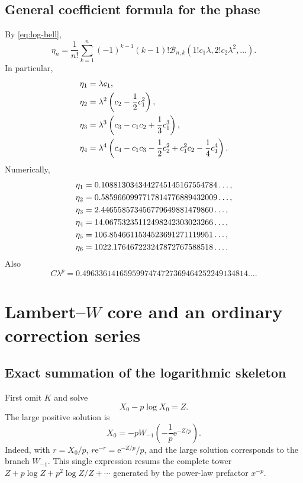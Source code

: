 \documentclass[11pt,a4paper,oneside,openany]{book}
\theoremstyle{definition}
\theoremstyle{remark}
\newcommand{\e}{\mathrm e}
\newcommand{\pBell}[2]{\mathcal B_{#1,#2}}
\begin{document}
\section{General coefficient formula for the phase}
By \cref{eq:log-bell},
\begin{equation}
 \boxed{
 \eta_n=\frac1{n!}\sum_{k=1}^n(-1)^{k-1}(k-1)!
 \pBell nk(1!c_1\lambda,2!c_2\lambda^2,\ldots).}
 \label{eq:eta-master}
\end{equation}
In particular,
\begin{align}
 \eta_1&=\lambda c_1,\notag\\
 \eta_2&=\lambda^2\left(c_2-\frac12c_1^2\right),\notag\\
 \eta_3&=\lambda^3\left(c_3-c_1c_2+\frac13c_1^3\right),\notag\\
 \eta_4&=\lambda^4\left(c_4-c_1c_3-\frac12c_2^2+c_1^2c_2-\frac14c_1^4\right).
 \label{eq:eta-first-symbolic}
\end{align}
Numerically,
\begin{align}
 \eta_1={}&0.1088130343442745145167554784\ldots,\notag\\
 \eta_2={}&0.5859660997717814776889432009\ldots,\notag\\
 \eta_3={}&2.446558573456779649881479860\ldots,\notag\\
 \eta_4={}&14.06753235112498242303023266\ldots,\notag\\
 \eta_5={}&106.8546611534523691271119951\ldots,\notag\\
 \eta_6={}&1022.176467223247872767588518\ldots.
 \label{eq:eta-numeric}
\end{align}
Also
\begin{equation}
 C\lambda^p
 =0.4963361416595997474727369464252249134814\ldots .
 \label{eq:Clambdap}
\end{equation}

\chapter{\texorpdfstring{Lambert--$W$}{Lambert--W} core and an ordinary correction series}
\label{ch:inverse-lambert}

\section{Exact summation of the logarithmic skeleton}
First omit $K$ and solve
\begin{equation}
 X_0-p\log X_0=Z.
 \label{eq:Lambert-core-equation}
\end{equation}
The large positive solution is
\begin{equation}
 \boxed{
 X_0=-pW_{-1}\!\left(-\frac1p\e^{-Z/p}\right).}
 \label{eq:X0-W}
\end{equation}
Indeed, with $r=X_0/p$,
$r\e^{-r}=\e^{-Z/p}/p$, and the large solution corresponds to the branch
$W_{-1}$.  This single expression resums the complete tower
$Z+p\log Z+p^2\log Z/Z+\cdots$ generated by the power-law prefactor
$x^{-p}$.
\end{document}
